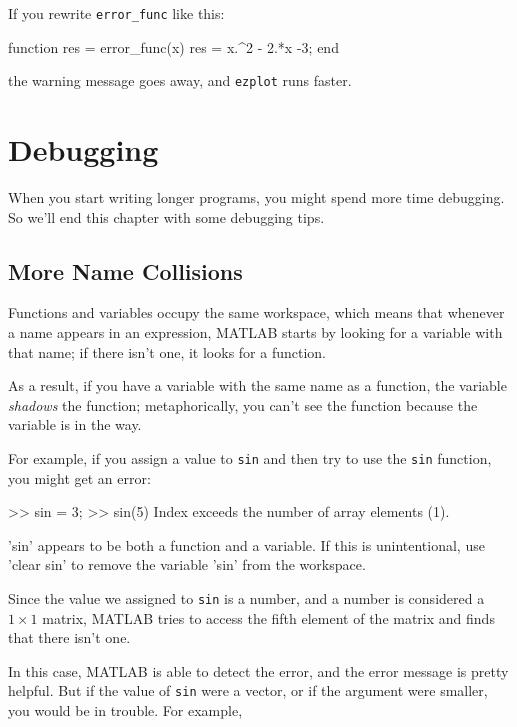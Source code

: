 
If you rewrite \lstinline{error_func} like this:

\begin{code}
function res = error_func(x)
    res = x.^2 - 2.*x -3;
end
\end{code}
the warning message goes away, and \lstinline{ezplot} runs faster.


\section{Debugging}

When you start writing longer programs, you might spend more time debugging.  So we'll end this chapter with some debugging tips.

\subsection{More Name Collisions}

Functions and variables occupy the same workspace, which means
that whenever a name appears in an expression, MATLAB starts by looking
for a variable with that name; if there isn't one, it looks for
a function.


As a result, if you have a variable with the same name as a function,
the variable \emph{shadows} the function; metaphorically, you can't see the function because the variable is in the way.

For example, if you assign
a value to \lstinline{sin} and then try to use the \lstinline{sin} function, you
might get an error:

\begin{code}
>> sin = 3;
>> sin(5)
Index exceeds the number of array elements (1).

'sin' appears to be both a function and a variable.
If this is unintentional, use 'clear sin' to remove
the variable 'sin' from the workspace.
\end{code}

Since the value we assigned to \lstinline{sin} is a number, and a number is considered a $1 \times 1$ matrix, MATLAB tries to access the fifth element of the matrix and finds that there isn't one.

In this case, MATLAB is able to detect the error, and the error message is pretty helpful.
But if the value of \lstinline{sin} were a vector, or if the argument were smaller, you would be in trouble.  For example,

